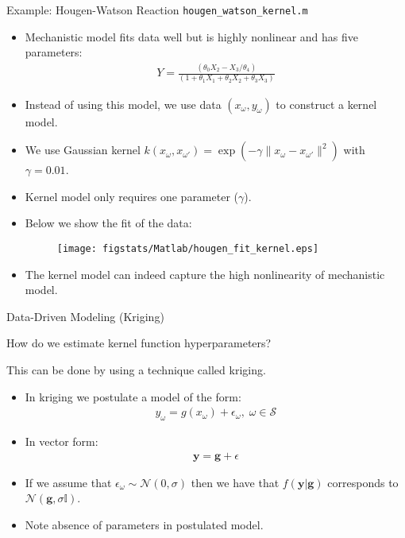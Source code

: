 \documentclass[handout,9pt]{beamer}
\begin{document}
%
\begin{frame}{Example: Hougen-Watson Reaction \footnotesize{\texttt{hougen\_watson\_kernel.m}}}

\begin{itemize}
  \setlength{\itemsep}{5pt}
\item Mechanistic model fits data well but is highly nonlinear and has five parameters:
\begin{align*}
Y=\frac{(\theta_0X_2-X_3/\theta_4)}{(1+\theta_1X_1+\theta_2X_2+\theta_3X_3)}
\end{align*}
\item Instead of using this model, we use data $(x_\omega,y_\omega)$ to construct a kernel model. 
\item We use Gaussian kernel $k(x_\omega,x_{\omega'})=\exp(-\gamma\|x_\omega-x_{\omega'}\|^2)$ with $\gamma=0.01$. 
\item Kernel model only requires one parameter ($\gamma$). 
\item Below we show the fit of the data:


\begin{figure}[!htb]
    \centering
	\texttt{[image: figstats/Matlab/hougen\_fit\_kernel.eps]}
\end{figure}
\item The kernel model can indeed capture the high nonlinearity of mechanistic model.
\end{itemize}
\end{frame}


\begin{frame}{Data-Driven Modeling (Kriging)}

\begin{block}{}
How do we estimate kernel function hyperparameters?
\end{block}

This can be done by using a technique called kriging. 
\begin{itemize}
  \setlength{\itemsep}{10pt}
\item In kriging we postulate a model of the form:
\begin{align*}
{y}_\omega = g(x_\omega)+\epsilon_\omega,\; \omega \in \mathcal{S}
\end{align*}
\item In vector form:
\begin{align*}
\mathbf{y}= \mathbf{g}+\epsilon
\end{align*}
\item If we assume that $\epsilon_\omega \sim \mathcal{N}(0,\sigma)$ then we have that $f(\mathbf{y}|\mathbf{g})$ corresponds to $\mathcal{N}(\mathbf{g},\sigma \mathbb{I})$. 
\item Note absence of parameters in postulated model. 
\end{itemize}


\end{frame}
\end{document}
